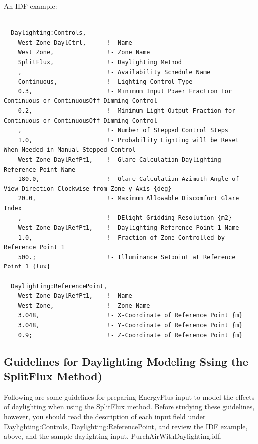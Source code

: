 An IDF example:

\begin{lstlisting}

  Daylighting:Controls,
    West Zone_DaylCtrl,      !- Name
    West Zone,               !- Zone Name
    SplitFlux,               !- Daylighting Method
    ,                        !- Availability Schedule Name
    Continuous,              !- Lighting Control Type
    0.3,                     !- Minimum Input Power Fraction for Continuous or ContinuousOff Dimming Control
    0.2,                     !- Minimum Light Output Fraction for Continuous or ContinuousOff Dimming Control
    ,                        !- Number of Stepped Control Steps
    1.0,                     !- Probability Lighting will be Reset When Needed in Manual Stepped Control
    West Zone_DaylRefPt1,    !- Glare Calculation Daylighting Reference Point Name
    180.0,                   !- Glare Calculation Azimuth Angle of View Direction Clockwise from Zone y-Axis {deg}
    20.0,                    !- Maximum Allowable Discomfort Glare Index
    ,                        !- DElight Gridding Resolution {m2}
    West Zone_DaylRefPt1,    !- Daylighting Reference Point 1 Name
    1.0,                     !- Fraction of Zone Controlled by Reference Point 1
    500.;                    !- Illuminance Setpoint at Reference Point 1 {lux}

  Daylighting:ReferencePoint,
    West Zone_DaylRefPt1,    !- Name
    West Zone,               !- Zone Name
    3.048,                   !- X-Coordinate of Reference Point {m}
    3.048,                   !- Y-Coordinate of Reference Point {m}
    0.9;                     !- Z-Coordinate of Reference Point {m}

\end{lstlisting}

\subsection{Guidelines for Daylighting Modeling Ssing the SplitFlux Method)}\label{guidelines-for-daylighting-modeling-splitflux-method}

Following are some guidelines for preparing EnergyPlus input to model the effects of daylighting when using the SplitFlux method. Before studying these guidelines, however, you should read the description of each input field under Daylighting:Controls, Daylighting:ReferencePoint, and review the IDF example, above, and the sample daylighting input, PurchAirWithDaylighting.idf.

